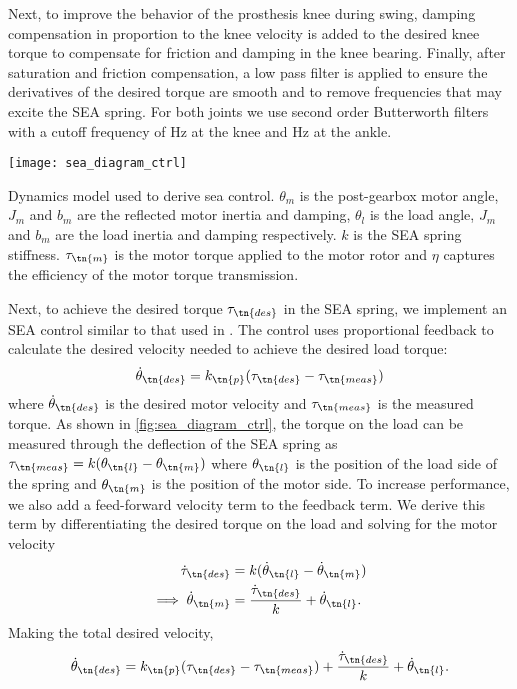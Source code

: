 Next, to improve the behavior of the prosthesis knee during swing, damping
compensation in proportion to the knee velocity is added to the desired knee
torque to compensate for friction and damping in the knee bearing. Finally,
after saturation and friction compensation, a low pass filter is applied to
ensure the derivatives of the desired torque are smooth and to remove
frequencies that may excite the SEA spring. For both joints we use second order
Butterworth filters with a cutoff frequency of \unit[25]{Hz} at the knee and
\unit[20]{Hz} at the ankle.

\begin{marginfigure}[-0.0in]
    \centering 
    \texttt{[image: sea\_diagram\_ctrl]}
    \caption[Dynamics model used to derive sea control]{Dynamics model used to
    derive sea control. $\theta_m$ is the post-gearbox motor angle, $J_m$ and
    $b_m$ are the reflected motor inertia and damping, $\theta_l$ is the load
    angle, $J_m$ and $b_m$ are the load inertia and damping respectively. $k$ is
    the SEA spring stiffness.  $\tau_\tn{m}$ is the motor torque applied to the
    motor rotor and $\eta$ captures the efficiency of the motor torque
    transmission.}\label{fig:sea_diagram_ctrl}
\end{marginfigure}
Next, to achieve the desired torque $\tau_\tn{des}$ in the SEA spring, we
implement an SEA control similar to that used in
\citet{schepelmann2012development}. The control uses proportional feedback to
calculate the desired velocity needed to achieve the desired load torque:
\begin{align}
    \dot \theta_\tn{des} = k_\tn{p} (\tau_\tn{des} - \tau_\tn{meas})
\end{align}
where $\dot \theta_\tn{des}$ is the desired motor velocity and $\tau_\tn{meas}$
is the measured torque. As shown in \cref{fig:sea_diagram_ctrl}, the torque on
the load can be measured through the deflection of the SEA spring as
$\tau_\tn{meas} = k (\theta_\tn{l} - \theta_\tn{m})$ where $\theta_\tn{l}$ is
the position of the load side of the spring and $\theta_\tn{m}$ is the position
of the motor side. To increase performance, we also add a feed-forward velocity
term to the feedback term. We derive this term by differentiating the desired
torque on the load and solving for the motor velocity
\begin{align}
    \dot \tau_\tn{des} &= k (\dot \theta_\tn{l} - \dot \theta_\tn{m}) \\
    \implies \dot \theta_\tn{m} &= \frac{\dot \tau_\tn{des}}{k} 
        + \dot \theta_\tn{l}.\label{eq:motor_vel_from_tau_des}
\end{align}
Making the total desired velocity,
\begin{align}
    \dot \theta_\tn{des} = k_\tn{p} (\tau_\tn{des} - \tau_\tn{meas}) 
        + \frac{\dot \tau_\tn{des}}{k} + \dot \theta_\tn{l}.
\end{align}

